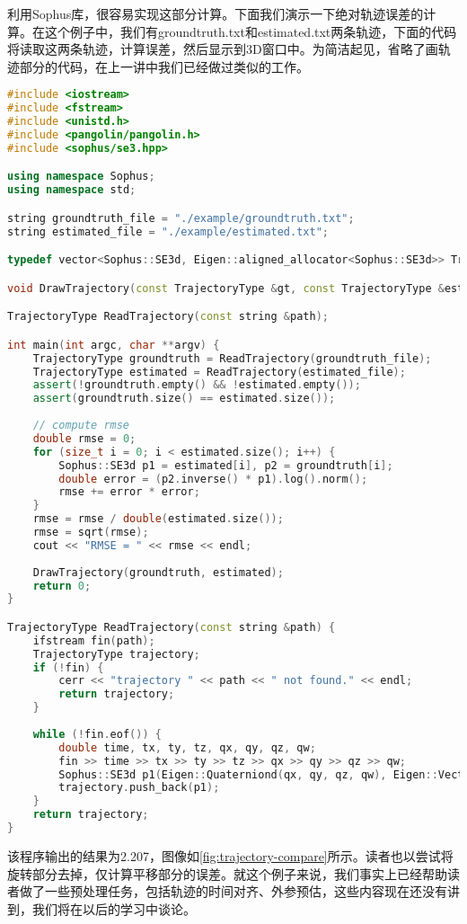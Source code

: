 利用Sophus库，很容易实现这部分计算。下面我们演示一下绝对轨迹误差的计算。在这个例子中，我们有groundtruth.txt和estimated.txt两条轨迹，下面的代码将读取这两条轨迹，计算误差，然后显示到3D窗口中。为简洁起见，省略了画轨迹部分的代码，在上一讲中我们已经做过类似的工作。
\begin{lstlisting}[language=c++,caption=slambook/ch4/example/trajectoryError.cpp（部分）]
#include <iostream>
#include <fstream>
#include <unistd.h>
#include <pangolin/pangolin.h>
#include <sophus/se3.hpp>

using namespace Sophus;
using namespace std;

string groundtruth_file = "./example/groundtruth.txt";
string estimated_file = "./example/estimated.txt";

typedef vector<Sophus::SE3d, Eigen::aligned_allocator<Sophus::SE3d>> TrajectoryType;

void DrawTrajectory(const TrajectoryType &gt, const TrajectoryType &esti);

TrajectoryType ReadTrajectory(const string &path);

int main(int argc, char **argv) {
	TrajectoryType groundtruth = ReadTrajectory(groundtruth_file);
	TrajectoryType estimated = ReadTrajectory(estimated_file);
	assert(!groundtruth.empty() && !estimated.empty());
	assert(groundtruth.size() == estimated.size());
	
	// compute rmse
	double rmse = 0;
	for (size_t i = 0; i < estimated.size(); i++) {
		Sophus::SE3d p1 = estimated[i], p2 = groundtruth[i];
		double error = (p2.inverse() * p1).log().norm();
		rmse += error * error;
	}
	rmse = rmse / double(estimated.size());
	rmse = sqrt(rmse);
	cout << "RMSE = " << rmse << endl;
	
	DrawTrajectory(groundtruth, estimated);
	return 0;
}

TrajectoryType ReadTrajectory(const string &path) {
	ifstream fin(path);
	TrajectoryType trajectory;
	if (!fin) {
		cerr << "trajectory " << path << " not found." << endl;
		return trajectory;
	}
	
	while (!fin.eof()) {
		double time, tx, ty, tz, qx, qy, qz, qw;
		fin >> time >> tx >> ty >> tz >> qx >> qy >> qz >> qw;
		Sophus::SE3d p1(Eigen::Quaterniond(qx, qy, qz, qw), Eigen::Vector3d(tx, ty, tz));
		trajectory.push_back(p1);
	}
	return trajectory;
}
\end{lstlisting}

该程序输出的结果为2.207，图像如\autoref{fig:trajectory-compare}所示。读者也以尝试将旋转部分去掉，仅计算平移部分的误差。就这个例子来说，我们事实上已经帮助读者做了一些预处理任务，包括轨迹的时间对齐、外参预估，这些内容现在还没有讲到，我们将在以后的学习中谈论。


